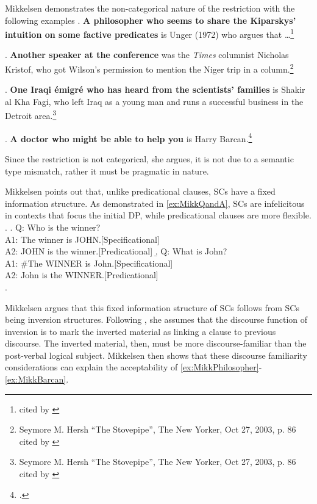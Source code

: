 \documentclass[GPFinal]{subfiles}
\begin{document}
Mikkelsen demonstrates the non-categorical nature of the restriction with the following examples
\ex.\label{ex:MikkPhilosopher} \textbf{A philosopher who seems to share the Kiparskys' intuition on some factive predicates} is Unger (1972) who argues that \dots\footnote{\textcite[][p. 195 fn8]{delacruz1976factives} cited by \textcite{mikkelsen2004specifying}}

\ex.\label{ex:MikkSpeaker} \textbf{Another speaker at the conference} was the \textit{Times} columnist Nicholas Kristof, who got Wilson's permission to mention the Niger trip in a column.\footnote{Seymore M. Hersh ``The Stovepipe'', The New Yorker, Oct 27, 2003, p. 86 cited by \textcite{mikkelsen2004specifying}}

\ex.\label{ex:MikkEmigre} \textbf{One Iraqi \'emigr\'e who has heard from the scientists' families} is Shakir al Kha Fagi, who left Iraq as a young man and runs a successful business in the Detroit area.\footnote{Seymore M. Hersh ``The Stovepipe'', The New Yorker, Oct 27, 2003, p. 86 cited by \textcite{mikkelsen2004specifying}}

\ex.\label{ex:MikkBarcan} \textbf{A doctor who might be able to help you} is Harry Barcan.\footcite{mikkelsen2004specifying}

Since the restriction is not categorical, she argues, it is not due to a semantic type mismatch, rather it must be pragmatic in nature.

Mikkelsen points out that, unlike predicational clauses, SCs have a fixed information structure.
As demonstrated in \ref{ex:MikkQandA}, SCs are infelicitous in contexts that focus the initial DP, while predicational clauses are more flexible.
\ex.\label{ex:MikkQandA}
\a. Q: Who is the winner?\\
A1: The winner is JOHN.\hfill[Specificational]\\
A2: JOHN is the winner.\hfill[Predicational]
\b. Q: What is John?\\
A1: \#The WINNER is John.\hfill[Specificational]\\
A2: John is the WINNER.\hfill[Predicational]\\
\z.

Mikkelsen argues that this fixed information structure of SCs follows from SCs being inversion structures.
Following \textcite{birner1994information,birner1996discourse}, she assumes that the discourse function of inversion is to mark the inverted material as linking a clause to previous discourse.
The inverted material, then, must be more discourse-familiar than the post-verbal logical subject.
Mikkelsen then shows that these discourse familiarity considerations can explain the acceptability of \ref{ex:MikkPhilosopher}-\ref{ex:MikkBarcan}.
\end{document}
